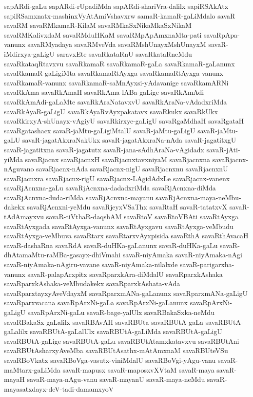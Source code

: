 {sapARdi-gaLu
sapARdi-rUpadiMda
sapARdi-shariVra-dalilx
sapiRSAkAtx
sapiRSamxnatx-mashinxVyAtAmiVshavxrw
samaR-kamaR-gaLiMdalo
savaR
savaRM
savaRMkamaR-KilaM
savaRMkaSxNikaMkaSxNikaM
savaRMKalivxdaM
savaRMduHKaM
savaRMpApAmxnaMta-pati
savaRpApa-vanunx
savaRMyadaya
savaRMveVda
savaRMshUnayxMshUnayxM
savaR-iMdirxya-gaLigU
saravxEte
savaRkataRnU
savaRkataRneMdu
savaRkataqRtavxvu
savaRkamaR
savaRkamaR-gaLa
savaRkamaR-gaLanunx
savaRkamaR-gaLigiMta
savaRkamaRtAyxga
savaRkamaRtAyxga-vanunx
savaRkamaR-vanunx
savaRkamaR-saMnAyxsi-yAdavanige
savaRkamARNi
savaRkAma
savaRkAmaH
savaRkAma-lABa-gaLige
savaRkAmAdi
savaRkAmAdi-gaLaMte
savaRkAraNatavxvU
savaRkAraNa-vAdadxriMda
savaRkAyaR-gaLigU
savaRkAyaRvAyxpakatavx
savaRkukx
savaRkUkx
savaRkirxyA-shUnayx-vAgiyU
savaRkirxye-gaLigU
savaRgaMdhaH
savaRgataH
savaRgatashacx
savaR-jaMtu-gaLigiMtalU
savaR-jaMtu-gaLigU
savaR-jaMtu-gaLU
savaR-jagatAkxraNakUkx
savaR-jagatAkxraNa-nAda
savaR-jagatitxgU
savaR-jagatitxna
savaR-jagatutx
savaR-jana-sAdhAraNa-vAgidadx
savaR-jAti-yiMda
savaRjacnx
savaRjacnxH
savaRjacnxtavxniyaM
savaRjacnxna
savaRjacnx-nAguvano
savaRjacnx-nAda
savaRjacnx-nigU
savaRjacnxnu
savaRjacnxnU
savaRjacnxra
savaRjacnx-rigU
savaRjacnx-LAgidAdxLe
savaRjacnx-vanenx
savaRjAcnxna-gaLu
savaRjAcnxna-dadadxriMda
savaRjAcnxna-diMda
savaRjAcnxna-duda-riMda
savaRjAcnxna-mayanu
savaRjAcnxna-maya-neMbu-dakekx
savaRjAcnxni-yeMdu
savaRjeyxVSaThx
savaRtaH
savaR-tatatxvX
savaR-tAdAmayxvu
savaR-tiVthaR-daqshAM
savaRtoV
savaRtoVBAti
savaRtAyxga
savaRtAyxgada
savaRtAyxga-vanunx
savaRtAyxgavu
savaRtAyxga-veMbudu
savaRtAyxga-veMbuva
savaRtarx
savaRtarxvAyxpisida
savaRthA
savaRthAvacaH
savaR-dashaRna
savaRdA
savaR-duHKa-gaLanunx
savaR-duHKa-gaLu
savaR-dhAtamaMtu-raMBa-gasayx-dhiVmahi
savaR-niyAmaka
savaR-niyAmaka-nAgi
savaR-niyAmaka-nAgiru-vavane
savaR-niyAmaka-nilalxde
savaR-parigarxha-vanunx
savaR-palapArxpitx
savaRparxkAra-diMdalU
savaRparxkAshaka
savaRparxkAshaka-veMbudakekx
savaRparxkAshata-vAda
savaRparxtayxyAveVdayxM
savaRparxmANa-gaLanunx
savaRparxmANa-gaLigU
savaRparxvacana
savaRpArxNi-gaLa
savaRpArxNi-gaLanunx
savaRpArxNi-gaLigU
savaRpArxNi-gaLu
savaR-bage-yalUlx
savaRBakaSxka-neMdu
savaRBakaSx-gaLalilx
savaRBAvAH
savaRBUta
savaRBUtA-gaLa
savaRBUtA-gaLalilx
savaRBUtA-gaLalUlx
savaRBUtA-gaLiMda
savaRBUtA-gaLigU
savaRBUtA-gaLige
savaRBUtA-gaLu
savaRBUtAtamxkatavxvu
savaRBUtAni
savaRBUtAsharxyAveMba
savaRBUtAsathx-mAtAmxnaM
savaRBUteVSu
savaRBoVkatx
savaRBoVga-vasutx-viniMdalU
savaRBoVgi-yAgu-vanu
savaR-maMtarx-gaLiMda
savaR-mapusx
savaR-maposxvXVtaM
savaR-maya
savaR-mayaH
savaR-maya-nAgu-vanu
savaR-mayanU
savaR-maya-neMdu
savaR-mayasatxdayx-deV-tadi-damamxyoV
}
